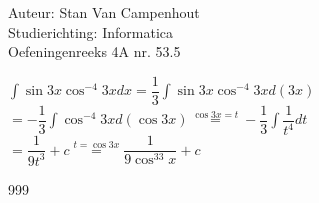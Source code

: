 \documentclass[a4paper]{article}
\begin{document}
  
\noindent \large Auteur: Stan Van Campenhout \\
\noindent \large Studierichting:  Informatica\\
\noindent \large Oefeningenreeks 4A nr. 53.5\\

\medskip

\normalsize

$ \displaystyle\int\sin 3x\cos^{-4}3xdx = \dfrac{1}{3}\displaystyle\int\sin3x\cos^{-4}3xd\left(3x\right) $\\

$ = -\dfrac{1}{3}\displaystyle\int\cos^{-4}3xd\left(\cos3x\right) \stackrel{\cos3x = t}{=} -\dfrac{1}{3}\displaystyle\int\dfrac{1}{t^4}dt $\\

$ = \dfrac{1}{9t^3} + c  \stackrel{t = \cos3x}{=} \dfrac{1}{9\cos^33x} + c $\\

\begin{thebibliography}{999}
\end{thebibliography}
\end{document}
